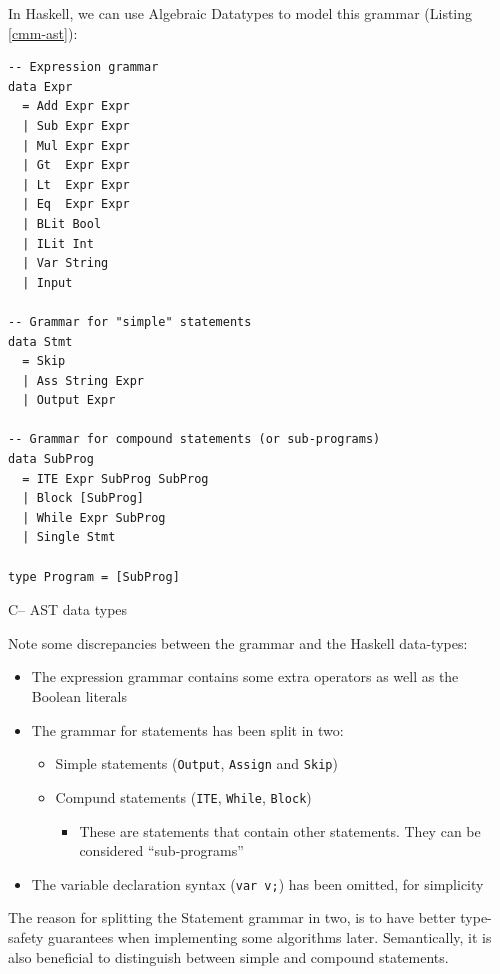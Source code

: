 \documentclass{article}
\begin{document}
In Haskell, we can use Algebraic Datatypes to model this grammar (Listing \ref{cmm-ast}):

\begin{listing}[H]
\begin{verbatim}
-- Expression grammar
data Expr
  = Add Expr Expr
  | Sub Expr Expr
  | Mul Expr Expr
  | Gt  Expr Expr
  | Lt  Expr Expr
  | Eq  Expr Expr
  | BLit Bool
  | ILit Int
  | Var String
  | Input

-- Grammar for "simple" statements
data Stmt
  = Skip
  | Ass String Expr
  | Output Expr

-- Grammar for compound statements (or sub-programs)
data SubProg
  = ITE Expr SubProg SubProg
  | Block [SubProg]
  | While Expr SubProg
  | Single Stmt

type Program = [SubProg]
\end{verbatim}
\caption{C-- AST data types}
\label{cmm-ast}
\end{listing}

Note some discrepancies between the grammar and the Haskell data-types:

\begin{itemize}
\itemsep1pt\parskip0pt
\item
  The expression grammar contains some extra operators as well as the
  Boolean literals
\item
  The grammar for statements has been split in two:

  \begin{itemize}
  \itemsep1pt\parskip0pt
  \item
    Simple statements (\texttt{Output}, \texttt{Assign} and
    \texttt{Skip})
  \item
    Compund statements (\texttt{ITE}, \texttt{While}, \texttt{Block})

    \begin{itemize}
    \itemsep1pt\parskip0pt
    \item
      These are statements that contain other statements. They can be
      considered ``sub-programs''
    \end{itemize}
  \end{itemize}
\item
  The variable declaration syntax (\texttt{var v;}) has been omitted,
  for simplicity
\end{itemize}

The reason for splitting the Statement grammar in two, is to have better
type-safety guarantees when implementing some algorithms later.
Semantically, it is also beneficial to distinguish between simple and
compound statements.
\end{document}
